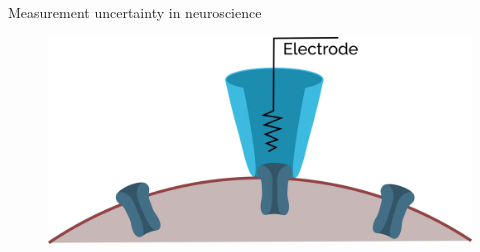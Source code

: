 \documentclass[presentation]{beamer}
\begin{document}



\begin{frame}{Measurement uncertainty in neuroscience}

  \begin{figure}
    \includegraphics[width=1\textwidth]{patch_clamp.png}
  \end{figure}

\end{frame}


\end{document}
